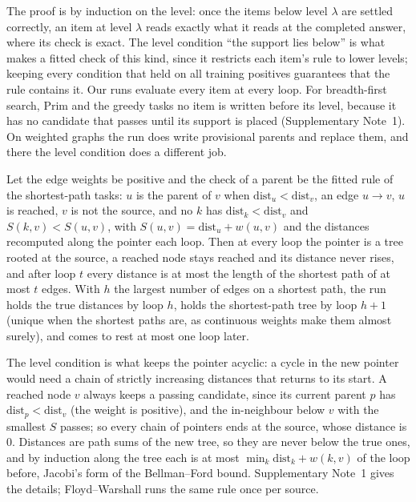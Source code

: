 The proof is by induction on the level: once the items below level $\lambda$ are settled correctly, an item at level
$\lambda$ reads exactly what it reads at the completed answer, where its check is exact. The level condition ``the support lies below'' is what
makes a fitted check of this kind, since it restricts each item's rule to lower levels; keeping every condition that held
on all training positives guarantees that the rule contains it. Our runs evaluate every item at every loop. For breadth-first search, Prim and the
greedy tasks no item is written before its level, because it has no candidate that passes until its support is placed
(Supplementary Note~1). On weighted graphs the run does write provisional parents and replace them, and there the level
condition does a different job.

\begin{proposition}\label{prop:bf}
Let the edge weights be positive and the check of a parent be the fitted rule of the shortest-path tasks: $u$ is the
parent of $v$ when $\mathrm{dist}_u < \mathrm{dist}_v$, an edge $u \to v$, $u$ is reached, $v$ is not the source, and no
$k$ has $\mathrm{dist}_k < \mathrm{dist}_v$ and $S(k,v) < S(u,v)$, with $S(u,v) = \mathrm{dist}_u + w(u,v)$ and the
distances recomputed along the pointer each loop. Then at every loop the pointer is a tree rooted at the source, a
reached node stays reached and its distance never rises, and after loop $t$ every distance is at most the length of the
shortest path of at most $t$ edges. With $h$ the largest number of edges on a shortest path, the run holds the true
distances by loop $h$, holds the shortest-path tree by loop $h+1$ (unique when the shortest paths are, as continuous
weights make them almost surely), and comes to rest at most one loop later.
\end{proposition}

The level condition is what keeps the pointer acyclic: a cycle in the new pointer would need a chain of strictly
increasing distances that returns to its start. A reached node $v$ always keeps a passing candidate, since its current
parent $p$ has $\mathrm{dist}_p < \mathrm{dist}_v$ (the weight is positive), and the in-neighbour below $v$ with the
smallest $S$ passes; so every chain of pointers ends at the source, whose distance is $0$. Distances are path sums of the
new tree, so they are never below the true ones, and by induction along the tree each is at most
$\min_k \mathrm{dist}_k + w(k,v)$ of the loop before, Jacobi's form of the Bellman--Ford bound\cite{bellman1958routing}.
Supplementary Note~1 gives the details; Floyd--Warshall runs the same rule once per source.


